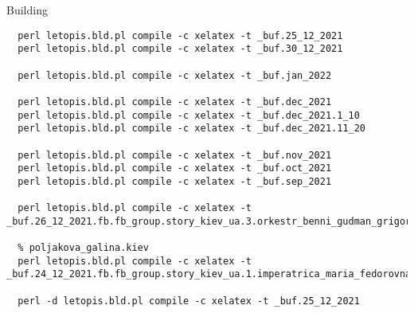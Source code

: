  
 
 
 
 
Building

\begin{verbatim}
  perl letopis.bld.pl compile -c xelatex -t _buf.25_12_2021
  perl letopis.bld.pl compile -c xelatex -t _buf.30_12_2021

  perl letopis.bld.pl compile -c xelatex -t _buf.jan_2022

  perl letopis.bld.pl compile -c xelatex -t _buf.dec_2021
  perl letopis.bld.pl compile -c xelatex -t _buf.dec_2021.1_10
  perl letopis.bld.pl compile -c xelatex -t _buf.dec_2021.11_20

  perl letopis.bld.pl compile -c xelatex -t _buf.nov_2021
  perl letopis.bld.pl compile -c xelatex -t _buf.oct_2021
  perl letopis.bld.pl compile -c xelatex -t _buf.sep_2021

  perl letopis.bld.pl compile -c xelatex -t _buf.26_12_2021.fb.fb_group.story_kiev_ua.3.orkestr_benni_gudman_grigorij_chapkis_1962

  % poljakova_galina.kiev
  perl letopis.bld.pl compile -c xelatex -t _buf.24_12_2021.fb.fb_group.story_kiev_ua.1.imperatrica_maria_fedorovna

  perl -d letopis.bld.pl compile -c xelatex -t _buf.25_12_2021

\end{verbatim}
